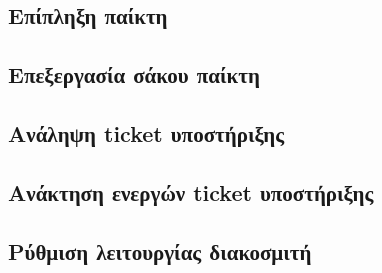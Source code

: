 \subsection{Επίπληξη παίκτη}
\subsection{Επεξεργασία σάκου παίκτη}
\subsection{Ανάληψη ticket υποστήριξης}
\subsection{Ανάκτηση ενεργών ticket υποστήριξης}
\subsection{Ρύθμιση λειτουργίας διακοσμιτή}